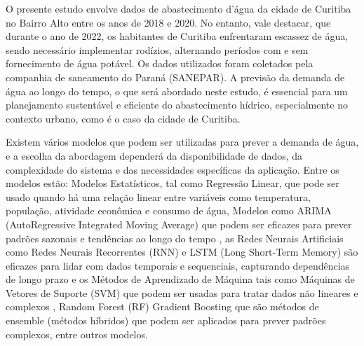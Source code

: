 O presente estudo envolve dados de abastecimento d'água da cidade de Curitiba no Bairro Alto entre os anos de 2018 e 2020. No entanto, vale destacar, que durante o ano de 2022, os habitantes de Curitiba enfrentaram escassez de água, sendo necessário implementar rodízios, alternando períodos com e sem fornecimento de água potável. Os dados utilizados foram coletados pela companhia de saneamento do Paraná (SANEPAR). A previsão da demanda de água ao longo do tempo, o que será abordado neste estudo, é essencial para um planejamento sustentável e eficiente do abastecimento hídrico, especialmente no contexto urbano, como é o caso da cidade de Curitiba. 

Existem vários modelos que podem ser utilizadas para prever a demanda de água, e a escolha da abordagem dependerá da disponibilidade de dados, da complexidade do sistema e das necessidades específicas da aplicação. Entre os modelos estão: Modelos Estatísticos, tal como Regressão Linear, que pode ser usado quando há uma relação linear entre variáveis como temperatura, população, atividade econômica e consumo de água, Modelos como ARIMA (AutoRegressive Integrated Moving Average) que podem ser eficazes para prever padrões sazonais e tendências ao longo do tempo \cite{OLIVEIRA2017177}, as Redes Neurais Artificiais como Redes Neurais Recorrentes (RNN) \cite{ASEERI2023101984} e LSTM (Long Short-Term Memory) \cite{SABZIPOUR2023130380} são eficazes para lidar com dados temporais e sequenciais, capturando dependências de longo prazo e os Métodos de Aprendizado de Máquina tais como Máquinas de Vetores de Suporte (SVM) que podem ser usadas para tratar dados não lineares e complexos \cite{CANDELIERI2019202}, Random Forest (RF) \cite{ALI2023731} Gradient Boosting \cite{DONG2023105579} que são métodos de ensemble (métodos híbridos) que podem ser aplicados para prever padrões complexos, entre outros modelos. 

